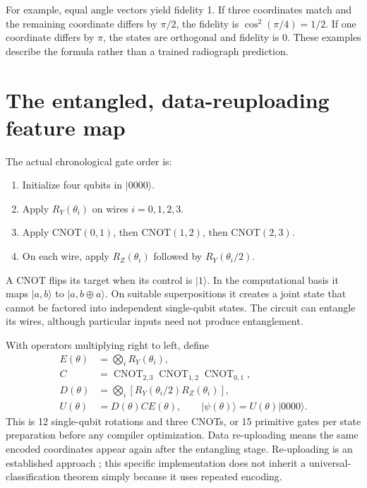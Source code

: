 \documentclass[11pt,a4paper]{report}
\newcommand{\ket}[1]{\lvert #1\rangle}
\begin{document}
For example, equal angle vectors yield fidelity 1. If three coordinates match and the remaining coordinate differs by $\pi/2$, the fidelity is $\cos^2(\pi/4)=1/2$. If one coordinate differs by $\pi$, the states are orthogonal and fidelity is 0. These examples describe the formula rather than a trained radiograph prediction.

\section{The entangled, data-reuploading feature map}
The actual chronological gate order is:
\begin{enumerate}
\item Initialize four qubits in $\ket{0000}$.
\item Apply $R_Y(\theta_i)$ on wires $i=0,1,2,3$.
\item Apply CNOT$(0,1)$, then CNOT$(1,2)$, then CNOT$(2,3)$.
\item On each wire, apply $R_Z(\theta_i)$ followed by $R_Y(\theta_i/2)$.
\end{enumerate}
A CNOT flips its target when its control is $\ket1$. In the computational basis it maps $\ket{a,b}$ to $\ket{a,b\oplus a}$. On suitable superpositions it creates a joint state that cannot be factored into independent single-qubit states. The circuit can entangle its wires, although particular inputs need not produce entanglement.

With operators multiplying right to left, define
\begin{align}
E(\theta)&=\bigotimes_i R_Y(\theta_i),\\
C&=\operatorname{CNOT}_{2,3}\operatorname{CNOT}_{1,2}\operatorname{CNOT}_{0,1},\\
D(\theta)&=\bigotimes_i [R_Y(\theta_i/2)R_Z(\theta_i)],\\
U(\theta)&=D(\theta)CE(\theta),\qquad
\ket{\psi(\theta)}=U(\theta)\ket{0000}.
\end{align}
This is 12 single-qubit rotations and three CNOTs, or 15 primitive gates per state preparation before any compiler optimization. Data re-uploading means the same encoded coordinates appear again after the entangling stage. Re-uploading is an established approach \cite{reupload}; this specific implementation does not inherit a universal-classification theorem simply because it uses repeated encoding.
\end{document}
